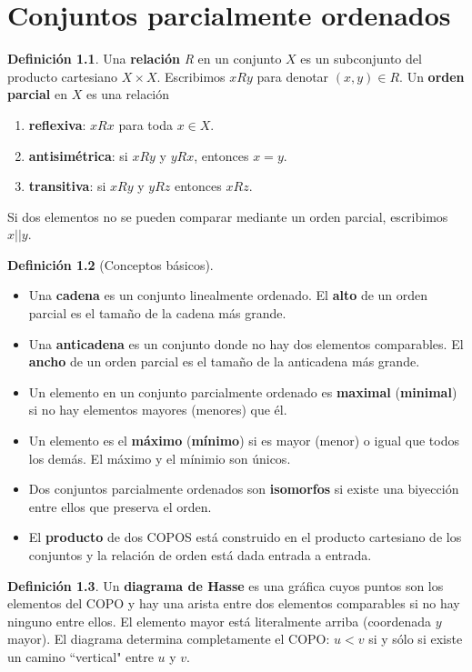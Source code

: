 \documentclass[spanish]{book}
\theoremstyle{definition}
\newtheorem*{defn}{Definición}
\begin{document}
\chapter{Conjuntos parcialmente ordenados}
\begin{defn}
	Una \textbf{relación} \textit{R} en un conjunto $X$ es un subconjunto del producto cartesiano $X\times X$. Escribimos $xRy$ para denotar $(x,y)\in R$. Un \textbf{orden parcial} en $X$ es una relación
	\begin{enumerate}
		\item[] \textbf{reflexiva}: $xRx$ para toda $x\in X$.
		\item[] \textbf{antisimétrica}: si  $xRy$ y $yRx$, entonces $x=y$.
		\item[] \textbf{transitiva}: si $xRy$ y $yRz$ entonces $xRz$.
	\end{enumerate}
	Si dos elementos no se pueden comparar mediante un orden parcial, escribimos $x||y$.
\end{defn}
\begin{defn}[Conceptos básicos]\leavevmode
	\begin{itemize}
		\item 	Una \textbf{cadena} es un conjunto linealmente ordenado. El \textbf{alto} de un orden parcial es el tamaño de la cadena más grande.
		\item Una \textbf{anticadena} es un conjunto donde no hay dos elementos comparables. El \textbf{ancho} de un orden parcial es el tamaño de la anticadena más grande.
		\item Un elemento en un conjunto parcialmente ordenado es \textbf{maximal} (\textbf{minimal}) si no hay elementos mayores (menores) que él.
		\item Un elemento es el \textbf{máximo} (\textbf{mínimo}) si es mayor (menor) o igual que todos los demás. El máximo y el mínimio son únicos.
		\item Dos conjuntos parcialmente ordenados son \textbf{isomorfos} si existe una biyección entre ellos que preserva el orden.
		\item El \textbf{producto} de dos COPOS está construido en el producto cartesiano de los conjuntos y la relación de orden está dada entrada a entrada.
	\end{itemize}
\end{defn}
\begin{defn}
	Un \textbf{diagrama de Hasse} es una gráfica cuyos puntos son los elementos del COPO y hay una arista entre dos elementos comparables si no hay ninguno entre ellos. El elemento mayor está literalmente arriba (coordenada $y$ mayor). El diagrama determina completamente el COPO: $u<v$ si y sólo si existe un camino ``vertical" entre $u$ y $v$.
\end{defn}
\end{document}
